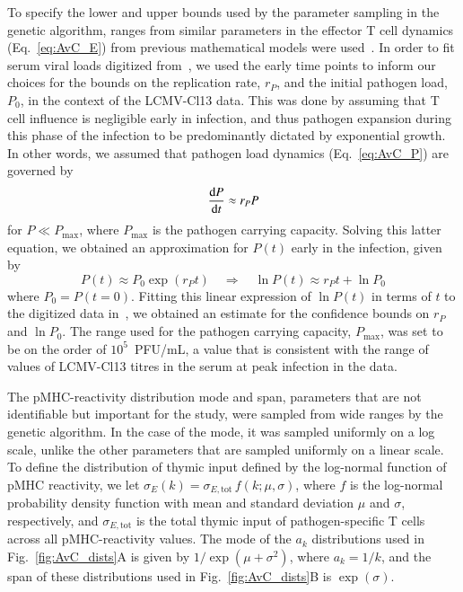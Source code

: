 To specify the lower and upper bounds used by the parameter sampling in the genetic algorithm, ranges from similar parameters in the effector T cell dynamics (Eq.~\eqref{eq:AvC_E}) from previous mathematical models were used~\cite{khadra2009role,jaberi2015continuum,jamaleddine2020quantifying}. In order to fit serum viral loads digitized from~\cite{wherry2003viral}, we used the early time points to inform our choices for the bounds on the replication rate, $r_P$, and the initial pathogen load, $P_0$, in the context of the LCMV-Cl13 data. This was done by assuming that T cell influence is negligible early in infection, and thus pathogen expansion during this phase of the infection to be predominantly dictated by exponential growth. In other words, we assumed that pathogen load dynamics (Eq.~\eqref{eq:AvC_P}) are governed by
%
\begin{equation*}
    \dv{P}{t} \approx r_P P
\end{equation*}
%
for $P \ll P_{\textrm{max}}$, where $P_{\textrm{max}}$ is the pathogen carrying capacity. Solving this latter equation, we obtained an approximation for $P(t)$ early in the infection, given by 
%
\begin{equation*}
    P(t) \approx P_0 \exp(r_P t) \quad \Rightarrow \quad \ln{P(t)} \approx r_P t + \ln{P_0}
\end{equation*}
%
where $P_0=P(t=0)$. Fitting this linear expression of $\ln{P(t)}$ in terms of $t$ to the digitized data in~\cite{wherry2003viral}, we obtained an estimate for the confidence bounds on $r_P$ and $\ln{P_0}$. The range used for the pathogen carrying capacity, $P_{\textrm{max}}$, was set to be on the order of $10^5$~PFU/mL, a value that is consistent with the range of values of LCMV-Cl13 titres in the serum at peak infection in the data.

The pMHC-reactivity distribution mode and span, parameters that are not identifiable but important for the study, were sampled from wide ranges by the genetic algorithm. In the case of the mode, it was sampled uniformly on a log scale, unlike the other parameters that are sampled uniformly on a linear scale. To define the distribution of thymic input defined by the log-normal function of pMHC reactivity, we let $\sigma_E(k)=\sigma_{E,\textrm{tot}} \, f(k;\mu,\sigma)$, where $f$ is the log-normal probability density function with mean and standard deviation $\mu$ and $\sigma$, respectively, and $\sigma_{E,\textrm{tot}}$ is the total thymic input of pathogen-specific T cells across all pMHC-reactivity values. The mode of the $a_k$ distributions used in Fig.~\ref{fig:AvC_dists}A is given by $1/\exp(\mu+\sigma^2)$, where $a_k=1/k$, and the span of these distributions used in Fig.~\ref{fig:AvC_dists}B is $\exp(\sigma)$.

